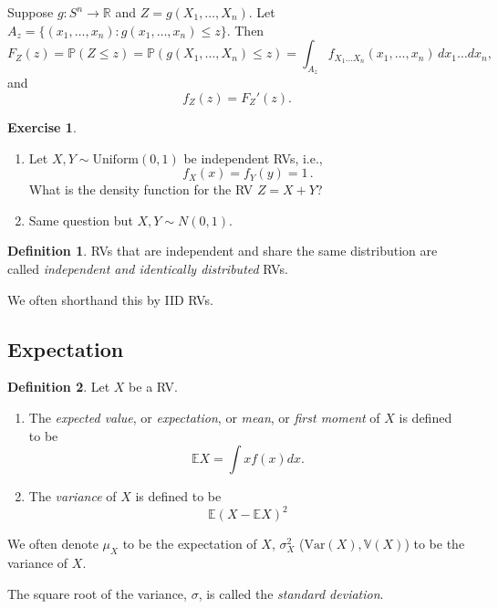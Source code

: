 \documentclass[
  openany]{book}
\theoremstyle{definition}
\newtheorem{definition}{Definition}[chapter]
\theoremstyle{definition}
\theoremstyle{definition}
\newtheorem{exercise}{Exercise}[chapter]
\theoremstyle{definition}
\theoremstyle{remark}
\begin{document}
Suppose \(g: S^n \to \mathbb{R}\) and \(Z = g(X_1, \dots, X_n)\).
Let \(A_z = \{ (x_1,\dots, x_n): g(x_1,\dots, x_n) \leq z \}\).
Then
\[F_Z(z) = \mathbb{P}(Z \leq z) = \mathbb{P}(g(X_1, \dots, X_n) \leq z) = \int_{A_z} f_{X_1\dots X_n}(x_1,\dots,x_n) \, dx_1\dots dx_n, \]
and
\[f_Z(z) = F_Z'(z).\]

\begin{exercise}
\leavevmode

\begin{enumerate}
\def\labelenumi{\arabic{enumi}.}
\item
  Let \(X, Y \sim \text{Uniform}(0,1)\) be independent RVs, i.e.,
  \[f_{X}(x) = f_{Y}(y) = 1\,.\]
  What is the density function for the RV \(Z = X + Y\)?
\item
  Same question but \(X, Y \sim N(0,1)\).
\end{enumerate}

\end{exercise}

\begin{definition}
RVs that are independent and share the same distribution are called
\emph{independent and identically distributed} RVs.

We often shorthand this by IID RVs.
\end{definition}

\subsection{Expectation}\label{expectation}

\begin{definition}
Let \(X\) be a RV.

\begin{enumerate}
\def\labelenumi{\arabic{enumi}.}
\item
  The \emph{expected value}, or \emph{expectation}, or \emph{mean}, or \emph{first moment} of \(X\) is defined to be
  \[ \mathbb{E}X = \int x f(x)  dx. \]
\item
  The \emph{variance} of \(X\) is defined to be
  \[\mathbb{E}\left( X - \mathbb{E}X \right)^2\]
\end{enumerate}

We often denote \(\mu_X\) to be the expectation of \(X\), \(\sigma_X^2\) (\(\mathrm{Var}(X), \mathbb{V}(X)\)) to be the variance of \(X\).

The square root of the variance, \(\sigma\), is called the \emph{standard deviation}.
\end{definition}
\end{document}
